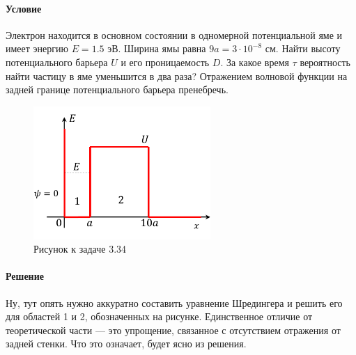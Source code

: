\documentclass[12pt]{article}
\begin{document}
\paragraph{Условие}
Электрон находится в основном состоянии в одномерной потенциальной яме и имеет энергию $E = 1.5$ эВ. Ширина ямы равна $9a = 3 \cdot 10^{-8}$ см. Найти высоту потенциального барьера $U$ и его проницаемость $D$. За какое время $\tau$ вероятность найти частицу в яме уменьшится в два раза? Отражением волновой функции на задней границе потенциального барьера пренебречь.
\begin{figure}[h]
    \centering
    \includegraphics[width=0.6\textwidth,height=\textheight,keepaspectratio]{Seminar_04/pics/pic_05.pdf}
    \caption{Рисунок к задаче 3.34}
\end{figure}

\paragraph{Решение}
Ну, тут опять нужно аккуратно составить уравнение Шредингера и решить его для областей 1 и 2, обозначенных на рисунке. Единственное отличие от теоретической части --- это упрощение, связанное с отсутствием отражения от задней стенки. Что это означает, будет ясно из решения. 
\end{document}
